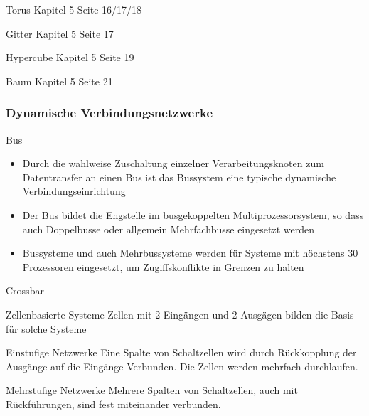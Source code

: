 \begin{defi}{Torus}
    Kapitel 5 Seite 16/17/18
\end{defi}

\begin{defi}{Gitter}
    Kapitel 5 Seite 17
\end{defi}

\begin{defi}{Hypercube}
    Kapitel 5 Seite 19
\end{defi}

\begin{defi}{Baum}
    Kapitel 5 Seite 21
\end{defi}

\subsubsection{Dynamische Verbindungsnetzwerke}

\begin{defi}{Bus}
    \begin{itemize}
        \item Durch die wahlweise Zuschaltung einzelner Verarbeitungsknoten zum Datentransfer an einen Bus ist das Bussystem eine typische dynamische Verbindungseinrichtung
        \item Der Bus bildet die Engstelle im busgekoppelten Multiprozessorsystem,
        so dass auch Doppelbusse oder allgemein Mehrfachbusse eingesetzt werden
        \item Bussysteme und auch Mehrbussysteme werden für Systeme mit höchstens 30 Prozessoren eingesetzt, 
        um Zugiffskonflikte in Grenzen zu halten
    \end{itemize}
\end{defi}

\begin{defi}{Crossbar}
    
\end{defi}

\begin{defi}{Zellenbasierte Systeme}
    Zellen mit 2 Eingängen und 2 Ausgägen bilden die Basis für solche Systeme
\end{defi}

\begin{defi}{Einstufige Netzwerke}
    Eine Spalte von Schaltzellen wird durch Rückkopplung der Ausgänge auf die Eingänge Verbunden. 
    Die Zellen werden mehrfach durchlaufen.
\end{defi}

\begin{defi}{Mehrstufige Netzwerke}
    Mehrere Spalten von Schaltzellen, auch mit Rückführungen, 
    sind fest miteinander verbunden.
\end{defi}

